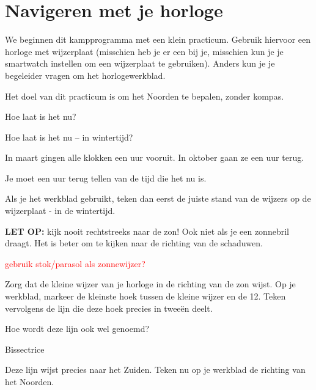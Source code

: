 \chapter{Navigeren met je horloge}

We beginnen dit kampprogramma met een klein practicum. Gebruik hiervoor een horloge met wijzerplaat (misschien heb je er een bij je, misschien kun je je smartwatch instellen om een wijzerplaat te gebruiken). Anders kun je je begeleider vragen om het horlogewerkblad.

Het doel van dit practicum is om het Noorden te bepalen, zonder kompas.

\begin{opgave}
    \begin{subopgave}
        Hoe laat is het nu?
    \end{subopgave}
    \begin{subopgave}
        Hoe laat is het nu -- in wintertijd?
        \begin{hint}
            In maart gingen alle klokken een uur vooruit. In oktober gaan ze een uur terug. 
        \end{hint}
        \begin{antwoord}
            Je moet een uur terug tellen van de tijd die het nu is.
        \end{antwoord}
    \end{subopgave}
\end{opgave}

Als je het werkblad gebruikt, teken dan eerst de juiste stand van de wijzers op de wijzerplaat - in de wintertijd.

\textbf{LET OP:} kijk nooit rechtstreeks naar de zon! Ook niet als je een zonnebril draagt. Het is beter om te kijken naar de richting van de schaduwen.

\textcolor{red}{gebruik stok/parasol als zonnewijzer?}

Zorg dat de kleine wijzer van je horloge in de richting van de zon wijst. Op je werkblad, markeer de kleinste hoek tussen de kleine wijzer en de 12. Teken vervolgens de lijn die deze hoek precies in twee\"{e}n deelt.

\begin{opgave}
    Hoe wordt deze lijn ook wel genoemd? 
    \begin{antwoord}
         Bissectrice
    \end{antwoord}
\end{opgave}

Deze lijn wijst precies naar het Zuiden. Teken nu op je werkblad de richting van het Noorden.

